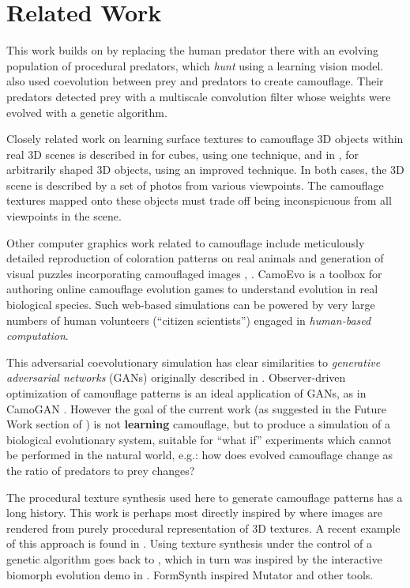\documentclass[letterpaper]{article}
\newcommand{\jargon}[1]{\textit{#1}}
\begin{document}
\section{Related Work}
This work builds on \citet{reynolds_iec_2011} by replacing the human predator there with an evolving population of procedural predators, which \jargon{hunt} using a learning vision model. \citet{harrington_coevolution_2014} also used coevolution between prey and predators to create camouflage. Their predators detected prey with a multiscale convolution filter whose weights were evolved with a genetic algorithm.
\par
Closely related work on learning surface textures to camouflage 3D objects within real 3D scenes is described in \citet{owens_camouflaging_2014} for cubes, using one technique, and in \citet{guo_ganmouflage_2022}, for arbitrarily shaped 3D objects, using an improved technique. In both cases, the 3D scene is described by a set of photos from various viewpoints. The camouflage textures mapped onto these objects must trade off being inconspicuous from all viewpoints in the scene.
\par
Other computer graphics work related to camouflage include meticulously detailed reproduction of coloration patterns on real animals \citep{de_gomensoro_malheiros_leopard_2020} and generation of visual puzzles incorporating camouflaged images \citep{chu_camo_image_2010}, \citep{Zhang_Yin_Nie_Zheng_2020}. CamoEvo \citep{hancock_camoevo_2022} is a toolbox for authoring online camouflage evolution games to understand evolution in real biological species. Such web-based simulations can be powered by very large numbers of human volunteers (“citizen scientists”) engaged in \jargon{human-based computation}.
\par
This adversarial coevolutionary simulation has clear similarities to \jargon{generative adversarial networks} (GANs) originally described in \citet{goodfellow_gan_2014}. Observer-driven optimization of camouflage patterns is an ideal application of GANs, as in CamoGAN \citep{talas_camogan_2020}. However the goal of the current work (as suggested in the Future Work section of \citet{reynolds_iec_2011}) is not \textbf{learning} camouflage, but to produce a simulation of a biological evolutionary system, suitable for “what if” experiments which cannot be performed in the natural world, e.g.: how does evolved camouflage change as the ratio of predators to prey changes?
\par
The procedural texture synthesis used here to generate camouflage patterns has a long history. This work is perhaps most directly inspired by \citet{perlin_image_1985} where images are rendered from purely procedural representation of 3D textures. A recent example of this approach is found in \citet{Guerrero_MatFormer_2022}. Using texture synthesis under the control of a genetic algorithm goes back to \citet{sims_artificial_1991}, which in turn was inspired by the interactive biomorph evolution demo in \citet{dawkins_blind_1986}. FormSynth \citep{latham_form_1989} inspired Mutator \citep{todd_evolutionary_1994} and other tools.
\end{document}
